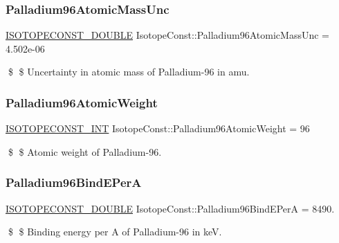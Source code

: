 \subsubsection{\texorpdfstring{Palladium96\+Atomic\+Mass\+Unc}{Palladium96AtomicMassUnc}}
{\footnotesize\ttfamily \mbox{\hyperlink{group___isotope_const-_macros_ga8f45a7272ce02c0b4c65c44636ed719a}{I\+S\+O\+T\+O\+P\+E\+C\+O\+N\+S\+T\+\_\+\+D\+O\+U\+B\+LE}} Isotope\+Const\+::\+Palladium96\+Atomic\+Mass\+Unc = 4.\+502e-\/06}

\$ \$ Uncertainty in atomic mass of Palladium-\/96 in amu. \mbox{\label{group___isotope_const-_palladium-_pd96_ga5d997257cad33d355aafaa709df9259a}} 
\subsubsection{\texorpdfstring{Palladium96\+Atomic\+Weight}{Palladium96AtomicWeight}}
{\footnotesize\ttfamily \mbox{\hyperlink{group___isotope_const-_macros_ga5f18360b3e99483a35c32d789e62621c}{I\+S\+O\+T\+O\+P\+E\+C\+O\+N\+S\+T\+\_\+\+I\+NT}} Isotope\+Const\+::\+Palladium96\+Atomic\+Weight = 96}

\$ \$ Atomic weight of Palladium-\/96. \mbox{\label{group___isotope_const-_palladium-_pd96_gacff3c65efd54bb065607a1a9e86f5dc9}} 
\subsubsection{\texorpdfstring{Palladium96\+Bind\+E\+PerA}{Palladium96BindEPerA}}
{\footnotesize\ttfamily \mbox{\hyperlink{group___isotope_const-_macros_ga8f45a7272ce02c0b4c65c44636ed719a}{I\+S\+O\+T\+O\+P\+E\+C\+O\+N\+S\+T\+\_\+\+D\+O\+U\+B\+LE}} Isotope\+Const\+::\+Palladium96\+Bind\+E\+PerA = 8490.}

\$ \$ Binding energy per A of Palladium-\/96 in keV. \mbox{\label{group___isotope_const-_palladium-_pd96_ga1f4cd073b1919ed3557d66bfb7f88a2c}} 
